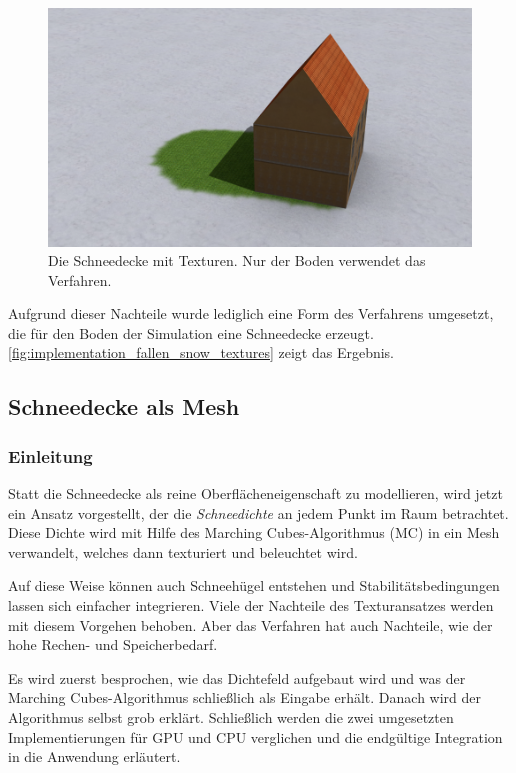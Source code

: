 \begin{figure}[h]
\centering
\includegraphics[width=14cm]{images/snow_cover_textures}
\caption{Die Schneedecke mit Texturen. Nur der Boden verwendet das Verfahren.}
\label{fig:implementation_fallen_snow_textures}
\end{figure}

Aufgrund dieser Nachteile wurde lediglich eine Form des Verfahrens
umgesetzt, die für den Boden der Simulation eine Schneedecke
erzeugt. \autoref{fig:implementation_fallen_snow_textures} zeigt das
Ergebnis.

\subsection{Schneedecke als Mesh}

\subsubsection{Einleitung}

Statt die Schneedecke als reine Oberflächeneigenschaft zu modellieren,
wird jetzt ein Ansatz vorgestellt, der die \emph{Schneedichte} an
jedem Punkt im Raum betrachtet. Diese Dichte wird mit Hilfe des
Marching Cubes-Algorithmus (MC) in ein Mesh verwandelt, welches dann
texturiert und beleuchtet wird.

Auf diese Weise können auch Schneehügel entstehen und
Stabilitätsbedingungen lassen sich einfacher integrieren. Viele der
Nachteile des Texturansatzes werden mit diesem Vorgehen behoben. Aber
das Verfahren hat auch Nachteile, wie der hohe Rechen- und
Speicherbedarf.

Es wird zuerst besprochen, wie das Dichtefeld aufgebaut wird und was
der Marching Cubes-Algorithmus schließlich als Eingabe erhält. Danach
wird der Algorithmus selbst grob erklärt. Schließlich werden die zwei
umgesetzten Implementierungen für GPU und CPU verglichen und die
endgültige Integration in die Anwendung erläutert.


